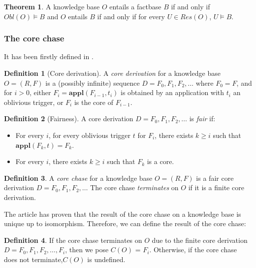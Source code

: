 \documentclass{article}
\theoremstyle{definition}
\newtheorem{definition}{Definition}[section]
\newtheorem{theorem}{Theorem}[section]
\theoremstyle{remark}
\newcommand{\Appl}{\textbf{appl}}
\begin{document}
\begin{theorem}
A knowledge base $O$ entails a factbase $B$ if and only if $\textit{Obl}(O) \models B$ and $O$ entails $B$ if and only if for every $U \in \textit{Res}(O)$, $U \models B$.
\end{theorem}




\subsubsection{The core chase}

It has been firstly defined in \cite{core_chase}.

\begin{definition}[Core derivation]
A \emph{core derivation} for a knowledge base $O = (R,F)$ is a (possibly infinite) sequence $D = F_0, F_1, F_2, \ldots$ where $F_0 = F$, and for $i >0$, either $F_{i}= \Appl(F_{i-1},t_i)$ is obtained by an application with $t_i$ an oblivious trigger, or $F_i$ is the core of $F_{i-1}$. 
\end{definition} 

\begin{definition}[Fairness]
A core derivation $D=F_0,F_1,F_2,\ldots$ is \emph{fair} if:
\begin{itemize}
\item For every $i$, for every oblivious trigger $t$ for $F_i$, there exists $k \geq i$ such that $\Appl(F_{k},t) = F_k$.
\item For every $i$, there exists $k \geq i$ such that $F_k$ is a core.

\end{itemize}
\end{definition}

\begin{definition}
A \emph{core chase} for a knowledge base $O= (R,F)$ is a fair core derivation $D=F_0,F_1,F_2,\ldots$ The core chase \emph{terminates} on $O$ if it is a finite core derivation.
\end{definition}

The article \cite{core_chase} has proven that the result of the core chase on a knowledge base is unique up to isomorphism. Therefore, we can define the result of the core chase:

\begin{definition}
If the core chase terminates on $O$ due to the finite core derivation $D=F_0,F_1,F_2,\ldots,F_i$, then we pose \emph{$\textit{C}(O)$} = $F_i$. Otherwise, if the core chase does not terminate,$\textit{C}(O)$ is undefined.
\end{definition}
\end{document}

